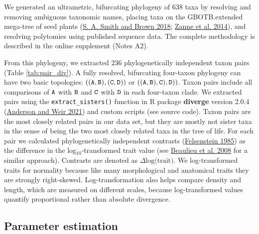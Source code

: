 \documentclass[
  12pt,
]{article}
\begin{document}
We generated an ultrametric, bifurcating phylogeny of 638 taxa by resolving and removing ambiguous taxonomic names, placing taxa on the GBOTB.extended mega-tree of seed plants (\protect\hyperlink{ref-smith_constructing_2018}{S. A. Smith and Brown 2018}; \protect\hyperlink{ref-zanne_three_2014}{Zanne et al. 2014}), and resolving polytomies using published sequence data. The complete methodology is described in the online supplement (Notes A2).

From this phylogeny, we extracted 236 phylogenetically independent taxon pairs (Table \ref{tab:pair_div}). A fully resolved, bifurcating four-taxon phylogeny can have two basic topologies: \(\tt{((A,B),(C,D))}\) or \(\tt{((A,B),C),D))}\). Taxon pairs include all comparisons of \(\tt{A}\) with \(\tt{B}\) and \(\tt{C}\) with \(\tt{D}\) in each four-taxon clade. We extracted pairs using the \texttt{extract\_sisters()} function in R package \textbf{diverge} version 2.0.4 (\protect\hyperlink{ref-anderson_diverge_2021}{Anderson and Weir 2021}) and custom scripts (see source code). Taxon pairs are the most closely related pairs in our data set, but they are mostly not sister taxa in the sense of being the two most closely related taxa in the tree of life. For each pair we calculated phylogenetically independent contrasts (\protect\hyperlink{ref-felsenstein_phylogenies_1985}{Felsenstein 1985}) as the difference in the log\(_{10}\)-transformed trait value (see \protect\hyperlink{ref-beaulieu_genome_2008}{Beaulieu et al. 2008} for a similar approach). Contrasts are denoted as \(\Delta \text{log(trait)}\). We log-transformed traits for normality because like many morphological and anatomical traits they are strongly right-skewed. Log-transformation also helps compare density and length, which are measured on different scales, because log-transformed values quantify proportional rather than absolute divergence.

\hypertarget{parameter-estimation}{%
\subsection{Parameter estimation}\label{parameter-estimation}}
\end{document}
